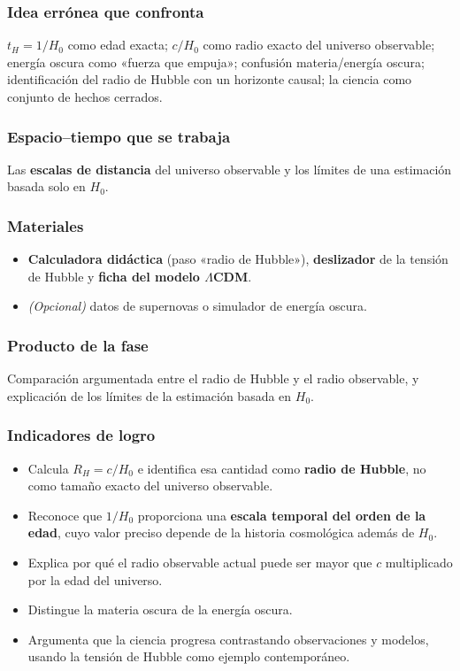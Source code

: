 \subsubsection*{Idea errónea que confronta}

$t_H=1/H_{0}$ como edad exacta; $c/H_0$ como radio exacto del universo observable; energía oscura como «fuerza que empuja»; confusión materia/energía oscura; identificación del radio de Hubble con un horizonte causal; la ciencia como conjunto de hechos cerrados.

\subsubsection*{Espacio--tiempo que se trabaja}

Las \textbf{escalas de distancia} del universo observable y los límites de una estimación basada solo en $H_0$.

\subsubsection*{Materiales}

\begin{itemize}
\item \textbf{Calculadora didáctica} (paso «radio de Hubble»), \textbf{deslizador} de la tensión de Hubble y \textbf{ficha del modelo $\Lambda$CDM}.
\item \textit{(Opcional)} datos de supernovas o simulador de energía oscura.
\end{itemize}

\subsubsection*{Producto de la fase}

Comparación argumentada entre el radio de Hubble y el radio observable, y explicación de los límites de la estimación basada en $H_0$.

\subsubsection*{Indicadores de logro}

\begin{itemize}
\item Calcula $R_H=c/H_0$ e identifica esa cantidad como \textbf{radio de Hubble}, no como tamaño exacto del universo observable.
\item Reconoce que $1/H_{0}$ proporciona una \textbf{escala temporal del orden de la edad}, cuyo valor preciso depende de la historia cosmológica además de $H_0$.
\item Explica por qué el radio observable actual puede ser mayor que $c$ multiplicado por la edad del universo.
\item Distingue la materia oscura de la energía oscura.
\item Argumenta que la ciencia progresa contrastando observaciones y modelos, usando la tensión de Hubble como ejemplo contemporáneo.
\end{itemize}

